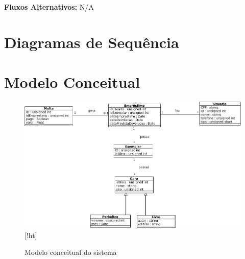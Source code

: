 \documentclass[
	12pt,				%
	openright,			%
	oneside,			%
	a4paper,			%
	english,			%
	brazil				%
	]{abntex2}
\begin{document}
\textbf{Fluxos Alternativos:} N/A

\chapter{Diagramas de Sequência}

\chapter{Modelo Conceitual}

\begin{figure}
\includegraphics[width=1\textwidth]{modeloConceitual}[!ht]
\label{fig:figura1}
\caption{\small Modelo conceitual do sistema}
\end{figure}




\postextual





\printindex
\end{document}
